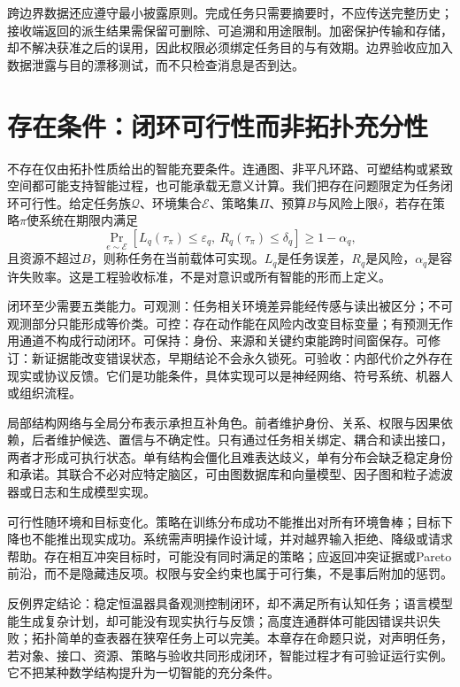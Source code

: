 跨边界数据还应遵守最小披露原则。完成任务只需要摘要时，不应传送完整历史；接收端返回的派生结果需保留可删除、可追溯和用途限制。加密保护传输和存储，却不解决获准之后的误用，因此权限必须绑定任务目的与有效期。边界验收应加入数据泄露与目的漂移测试，而不只检查消息是否到达。

\section{存在条件：闭环可行性而非拓扑充分性}
\label{sec:section_1941}

不存在仅由拓扑性质给出的智能充要条件。连通图、非平凡环路、可塑结构或紧致空间都可能支持智能过程，也可能承载无意义计算。我们把存在问题限定为任务闭环可行性。给定任务族$\mathcal Q$、环境集合$\mathcal E$、策略集$\Pi$、预算$B$与风险上限$\delta$，若存在策略$\pi$使系统在期限内满足
\begin{equation}
\Pr_{e\sim\mathcal E}[L_q(\tau_\pi)\le\varepsilon_q,\ R_q(\tau_\pi)\le\delta_q]\ge1-\alpha_q,
\end{equation}
且资源不超过$B$，则称任务在当前载体可实现。$L_q$是任务误差，$R_q$是风险，$\alpha_q$是容许失败率。这是工程验收标准，不是对意识或所有智能的形而上定义。

闭环至少需要五类能力。可观测：任务相关环境差异能经传感与读出被区分；不可观测部分只能形成等价类。可控：存在动作能在风险内改变目标变量；有预测无作用通道不构成行动闭环。可保持：身份、来源和关键约束能跨时间窗保存。可修订：新证据能改变错误状态，早期结论不会永久锁死。可验收：内部代价之外存在现实或协议反馈。它们是功能条件，具体实现可以是神经网络、符号系统、机器人或组织流程。

局部结构网络与全局分布表示承担互补角色。前者维护身份、关系、权限与因果依赖，后者维护候选、置信与不确定性。只有通过任务相关绑定、耦合和读出接口，两者才形成可执行状态。单有结构会僵化且难表达歧义，单有分布会缺乏稳定身份和承诺。其联合不必对应特定脑区，可由图数据库和向量模型、因子图和粒子滤波器或日志和生成模型实现。

可行性随环境和目标变化。策略在训练分布成功不能推出对所有环境鲁棒；目标下降也不能推出现实成功。系统需声明操作设计域，并对越界输入拒绝、降级或请求帮助。存在相互冲突目标时，可能没有同时满足的策略；应返回冲突证据或Pareto前沿，而不是隐藏违反项。权限与安全约束也属于可行集，不是事后附加的惩罚。

反例界定结论：稳定恒温器具备观测控制闭环，却不满足所有认知任务；语言模型能生成复杂计划，却可能没有现实执行与反馈；高度连通群体可能因错误共识失败；拓扑简单的查表器在狭窄任务上可以完美。本章存在命题只说，对声明任务，若对象、接口、资源、策略与验收共同形成闭环，智能过程才有可验证运行实例。它不把某种数学结构提升为一切智能的充分条件。

